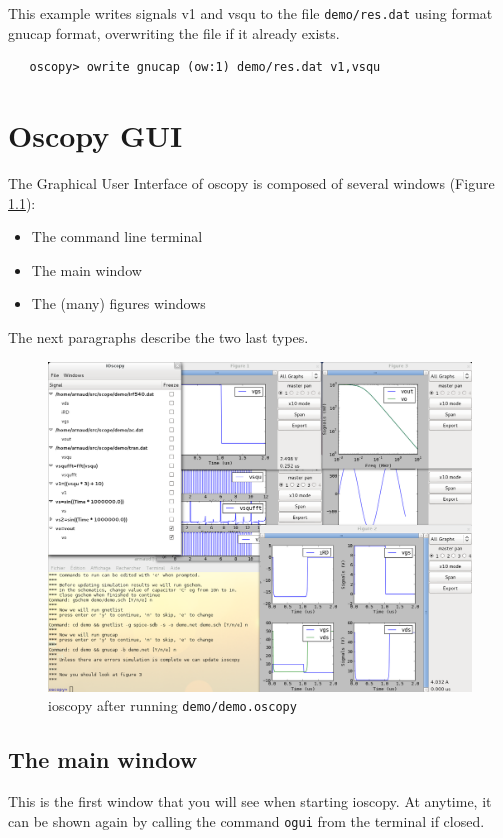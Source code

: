 \documentclass[a4paper,11pt]{report}
\begin{document}
\noindent This example writes signals v1 and vsqu to the file \texttt{demo/res.dat} using format gnucap format,
   overwriting the file if it already exists.
\begin{lstlisting}
   oscopy> owrite gnucap (ow:1) demo/res.dat v1,vsqu
\end{lstlisting}
\newpage
\chapter{Oscopy GUI}
The Graphical User Interface of oscopy is composed of several windows (Figure \ref{fig:screenshot}):
\begin{itemize}
\item The command line terminal
\item The main window
\item The (many) figures windows
\end{itemize}
The next paragraphs describe the two last types.

\begin{figure}[htbp]
  \centering
  \includegraphics[width=.8\textwidth]{../png/ioscopy.png}
  \caption{ioscopy after running \texttt{demo/demo.oscopy}}
  \label{fig:screenshot}
\end{figure}

\section{The main window}
This is the first window that you will see when starting ioscopy.
At anytime, it can be shown again by calling the command \texttt{ogui} from the terminal if closed.
\end{document}
